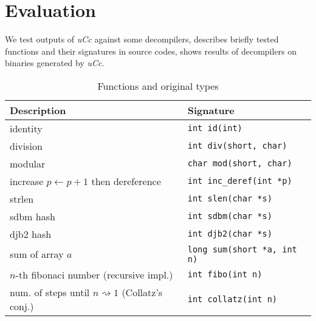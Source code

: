 \documentclass[compsoc,conference,a4paper,10pt,times]{IEEEtran}
\begin{document}



\section{Evaluation}
\noindent
We test outputs of \emph{uCc} against some decompilers,  describes briefly
tested functions and their signatures in source codes,  shows results of
decompilers on binaries generated by \emph{uCc}.

\begin{table*}
	\begin{center}
		\caption{Functions and original types}\label{description}
		\begin{tabular}{|l|l|}
			\hline
			Description & Signature \\
			\hline
			identity & \texttt{int id(int)} \\
			\hline
			division & \texttt{int div(short, char)} \\
			\hline
			modular & \texttt{char mod(short, char)} \\
			\hline
			increase $p \leftarrow p + 1$ then dereference & \texttt{int inc\_deref(int *p)} \\
			\hline
			strlen  & \texttt{int slen(char *s)} \\
			\hline
			sdbm hash & \texttt{int sdbm(char *s)} \\
			\hline
			djb2 hash & \texttt{int djb2(char *s)} \\
			\hline
			sum of array $a$ & \texttt{long sum(short *a, int n)} \\
			\hline
			$n$-th fibonaci number (recursive impl.) & \texttt{int fibo(int n)} \\
			\hline
			num. of steps until $n \rightsquigarrow 1$ (Collatz's conj.)  & \texttt{int collatz(int n)} \\
			\hline
		\end{tabular}
	\end{center}
\end{table*}
\end{document}
